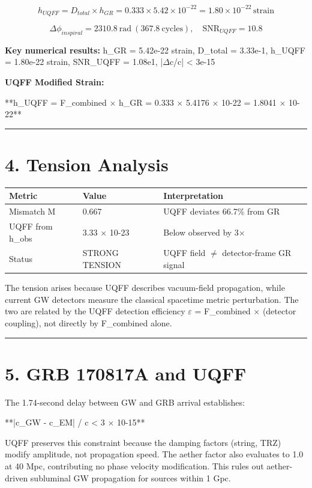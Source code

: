 \documentclass[11pt]{article}
\begin{document}
$$h_{UQFF} = D_{total} \times h_{GR} = 0.333 \times 5.42\times10^{-22} = 1.80\times10^{-22}\,\mathrm{strain}$$

$$\Delta\phi_{inspiral} = 2310.8\ \mathrm{rad}\ (367.8\ \mathrm{cycles}),\quad \mathrm{SNR}_{UQFF} = 10.8$$

\textbf{Key numerical results:} h\_GR = 5.42e-22 strain, D\_total = 3.33e-1, h\_UQFF = 1.80e-22 strain, SNR\_UQFF = 1.08e1, |$\Delta$c/c| < 3e-15

\textbf{UQFF Modified Strain:}

**h\_UQFF = F\_combined $\times$ h\_GR = 0.333 $\times$ 5.4176 $\times$ 10-22 = 1.8041 $\times$ 10-22**

\noindent\rule{\textwidth}{0.4pt}

\section*{4. Tension Analysis}

\begin{center}
\begin{longtable}{lll}
\toprule
Metric & Value & Interpretation \tabularnewline
\midrule
\endhead
Mismatch M & 0.667 & UQFF deviates 66.7\% from GR \tabularnewline
UQFF from h\_obs & 3.33 $\times$ 10-23 & Below observed by 3$\times$ \tabularnewline
Status & STRONG TENSION & UQFF field $\neq$ detector-frame GR signal \tabularnewline
\bottomrule
\end{longtable}
\end{center}

The tension arises because UQFF describes vacuum-field propagation, while current GW detectors measure the classical spacetime metric perturbation. The two are related by the UQFF detection efficiency $\varepsilon$ = F\_combined $\times$ (detector coupling), not directly by F\_combined alone.

\noindent\rule{\textwidth}{0.4pt}

\section*{5. GRB 170817A and UQFF}

The 1.74-second delay between GW and GRB arrival establishes:

**|c\_GW - c\_EM| / c < 3 $\times$ 10-15**

UQFF preserves this constraint because the damping factors (string, TRZ) modify amplitude, not propagation speed. The aether factor also evaluates to 1.0 at 40 Mpc, contributing no phase velocity modification. This rules out aether-driven subluminal GW propagation for sources within 1 Gpc.
\end{document}
